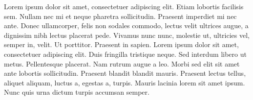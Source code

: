 Lorem ipsum dolor sit amet, consectetuer adipiscing elit. Etiam lobortis facilisis sem. Nullam nec mi et neque pharetra sollicitudin. Praesent imperdiet mi nec ante. Donec ullamcorper, felis non sodales commodo, lectus velit ultrices augue, a dignissim nibh lectus placerat pede. Vivamus nunc nunc, molestie ut, ultricies vel, semper in, velit. Ut porttitor. Praesent in sapien. Lorem ipsum dolor sit amet, consectetuer adipiscing elit. Duis fringilla tristique neque. Sed interdum libero ut metus. Pellentesque placerat. Nam rutrum augue a leo. Morbi sed elit sit amet ante lobortis sollicitudin. Praesent blandit blandit mauris. Praesent lectus tellus, aliquet aliquam, luctus a, egestas a, turpis. Mauris lacinia lorem sit amet ipsum. Nunc quis urna dictum turpis accumsan semper.